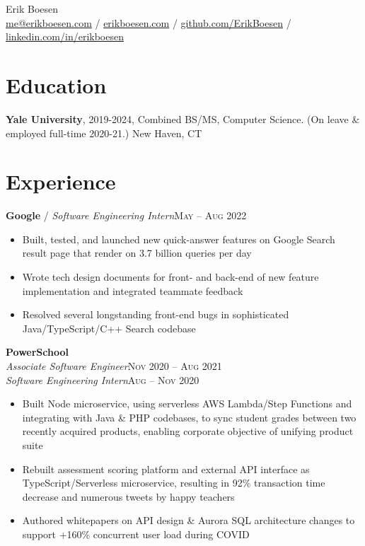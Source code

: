 \documentclass[10pt, a4paper]{article}
\begin{document}
{\LARGE Erik Boesen}\\
\href{mailto:me@erikboesen.com}{me@erikboesen.com} / \href{https://erikboesen.com}{erikboesen.com} / \href{https://github.com/ErikBoesen}{github.com/ErikBoesen} / \href{https://www.linkedin.com/in/erikboesen}{linkedin.com/in/erikboesen}\\

\vspace{-7mm}
\section*{Education}
\noindent
\textbf{Yale University}, 2019-2024, Combined BS/MS, Computer Science. (On leave \& employed full-time 2020-21.) New Haven, CT\\

\vspace{-7mm}
\section*{Experience}
\textbf{Google} / \textit{Software Engineering Intern}\hfill \textsc{May -- Aug 2022}\\
\begin{itemize}
    \vspace{-7mm}
    \item Built, tested, and launched new quick-answer features on Google Search result page that render on 3.7 billion queries per day
    \item Wrote tech design documents for front- and back-end of new feature implementation and integrated teammate feedback
    \item Resolved several longstanding front-end bugs in sophisticated Java/TypeScript/C++ Search codebase
\end{itemize}

\textbf{PowerSchool}\\
\textit{Associate Software Engineer}\hfill \textsc{Nov 2020 -- Aug 2021}\\
\textit{Software Engineering Intern}\hfill \textsc{Aug -- Nov 2020}\\
\begin{itemize}
    \vspace{-7mm}
    \item Built Node microservice, using serverless AWS Lambda/Step Functions and integrating with Java \& PHP codebases, to sync student grades between two recently acquired products, enabling corporate objective of unifying product suite
    \item Rebuilt assessment scoring platform and external API interface as TypeScript/Serverless microservice, resulting in 92\% transaction time decrease and numerous tweets by happy teachers
    \item Authored whitepapers on API design \& Aurora SQL architecture changes to support +160\% concurrent user load during COVID
\end{itemize}
\end{document}

